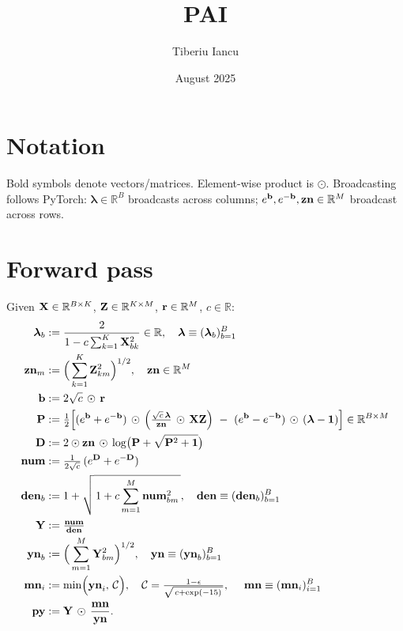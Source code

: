 \documentclass{article}
\title{PAI}
\author{Tiberiu Iancu}
\date{August 2025}
\begin{document}
\maketitle

\section*{Notation}
\newcommand{\ddfrac}[2]{\frac{\partial #1}{\partial #2}}
\newcommand{\colnorm}[1]{\left(\sum_{\text{col}} #1\right)}
\newcommand{\rownorm}[1]{\left(\sum_{\text{row}} #1\right)}
\newcommand{\lam}{\bm{\lambda}}



Bold symbols denote vectors/matrices. Element-wise product is $\odot$. Broadcasting follows PyTorch: $\lam\in\mathbb{R}^B$ broadcasts across columns; $\ev{b},\ev{-b},\v{zn}\in\mathbb{R}^M$ broadcast across rows.

\section{Forward pass}

\newcommand{\C}{\mathcal{C}}

Given $\v{X}\in\mathbb{R}^{B\times K}$, $\v{Z}\in\mathbb{R}^{K\times M}$, $\v{r}\in\mathbb{R}^{M}$, $c\in\mathbb{R}$:
\begin{align}
\lam_b &:= \frac{2}{1 - c\sum_{k=1}^K \v{X}{bk}^2}\in\mathbb{R},\quad \v{\lam}\equiv(\lam_b)_{b=1}^B \\
\v{zn}{m} &:= \Big(\sum_{k=1}^K \v{Z}{km}^2\Big)^{1/2},\quad \v{zn}\in\mathbb{R}^M \\
\v{b} &:= 2\sqrt{c}\,\odot\,\v{r}\\
\v{P} &:= \tfrac12\Big[(\ev{b}+\ev{-b})\,\odot\,\Big( \tfrac{\sqrt{c}\,\v{\lam}}{\v{zn}} \,\odot\, \v{XZ}\Big)\ -\ (\ev{b}-\ev{-b})\,\odot\,(\lam-\mathbf{1})\Big] \in \mathbb{R}^{B\times M} \\
\v{D} &:= 2\odot \v{zn}\,\odot\, \log\!\big(\v{P}+\sqrt{\v{P}^2+\mathbf{1}}\big) \\
\v{num} &:= \tfrac{1}{2\sqrt{c}}\,(\ev{D}+\ev{-D}) \\
\v{den}{b} &:= 1 + \sqrt{\,1 + c \sum_{m=1}^M \v{num}{bm}^2\,},\quad \v{den}\equiv(\v{den}{b})_{b=1}^B \\
\v{Y} &:= \tfrac{\v{num}}{\v{den}} \\
\v{yn}_b &:= \Big(\sum_{m=1}^M \v{Y}{bm}^2\Big)^{1/2},\quad \v{yn}\equiv(\v{yn}_b)_{b=1}^B \\
\v{mn}_i &:= \min\!\Big(\v{yn}{i},\,\C\Big),\quad \C = \tfrac{1-\epsilon}{\sqrt{\,c+\exp(-15)\,}},\ \quad \v{mn}\equiv(\v{mn}_i)_{i=1}^B \\
\v{py} &:= \v{Y}\,\odot\,\frac{\v{mn}}{\v{yn}}.
\end{align}
\end{document}
